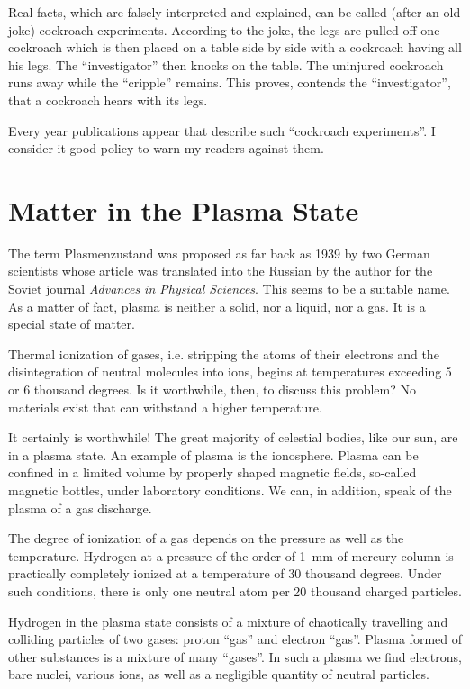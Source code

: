 Real facts, which are falsely interpreted and explained, can be called (after an old joke) cockroach experiments. According to the joke, the legs are pulled off one cockroach which is then placed on a table side by side with a cockroach having all his legs. The ``investigator'' then knocks on the table. The uninjured cockroach runs away while the ``cripple'' remains. This proves, contends the ``investigator'', that a cockroach hears with its legs.

Every year publications appear that describe such ``cockroach experiments''. I consider it good policy to warn my readers against them.

\section{Matter in the Plasma State}

The term Plasmenzustand was proposed as far back as 1939 by two German scientists whose article was translated into the Russian by the author for the Soviet journal \emph{Advances in Physical Sciences}. This seems to be a suitable name. As a matter of fact, plasma is neither a solid, nor a liquid, nor a gas. It is a special state of matter.

Thermal ionization of gases, i.e. stripping the atoms of their electrons and the disintegration of neutral molecules into ions, begins at temperatures exceeding 5 or 6 thousand degrees. Is it worthwhile, then, to discuss this problem? No materials exist that can withstand a higher temperature.

It certainly is worthwhile! The great majority of celestial bodies, like our sun, are in a plasma state. An example of plasma is the ionosphere. Plasma can be confined in a limited volume by properly shaped magnetic fields, so-called magnetic bottles, under laboratory conditions. We can, in addition, speak of the plasma of a gas discharge.

The degree of ionization of a gas depends on the pressure as well as the temperature. Hydrogen at a pressure of the order of \SI{1}{\milli\meter} of mercury column is practically completely ionized at a temperature of 30 thousand degrees. Under such conditions, there is only one neutral atom per 20 thousand charged particles.

Hydrogen in the plasma state consists of a mixture of chaotically travelling and colliding particles of two gases: proton ``gas'' and electron ``gas''. Plasma formed of other substances is a mixture of many ``gases''. In such a plasma we find electrons, bare nuclei, various ions, as well as a negligible quantity of neutral particles.

